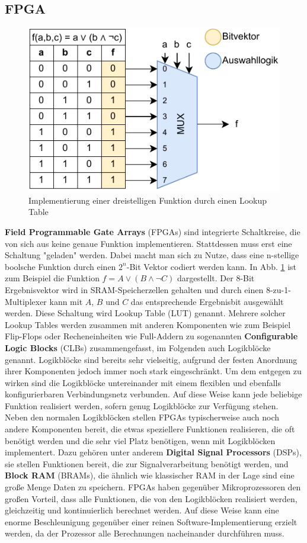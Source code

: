 \subsection{FPGA}
\label{sec:fpga}
\begin{figure}
    \center
    \includegraphics{images/LUT.pdf}
    \caption{Implementierung einer dreistelligen Funktion durch einen Lookup Table}
    \label{fig:fpga_lut}
\end{figure}
\textbf{Field Programmable Gate Arrays} (FPGAs) sind integrierte Schaltkreise, die von sich aus keine genaue Funktion implementieren. Stattdessen muss erst eine Schaltung "geladen" werden.
Dabei macht man sich zu Nutze, dass eine n-stellige boolsche Funktion durch einen $2^n$-Bit Vektor codiert werden kann. In Abb. \ref{fig:fpga_lut} ist zum Beispiel die Funktion $f = A \vee (B \wedge \neg C)$ dargestellt.
Der 8-Bit Ergebnisvektor wird in SRAM-Speicherzellen gehalten und durch einen 8-zu-1-Multiplexer kann mit $A$, $B$ und $C$ das entsprechende Ergebnisbit ausgewählt werden. Diese Schaltung wird Lookup Table (LUT) genannt.
Mehrere solcher Lookup Tables werden zusammen mit anderen Komponenten wie zum Beispiel Flip-Flops oder Recheneinheiten wie Full-Addern zu sogenannten \textbf{Configurable Logic Blocks} (CLBs) zusammengefasst, im Folgenden auch Logikblöcke genannt.
Logikblöcke sind bereits sehr vielseitig, aufgrund der festen Anordnung ihrer Komponenten jedoch immer noch stark eingeschränkt. Um dem entgegen zu wirken sind die Logikblöcke untereinander mit einem flexiblen
und ebenfalls konfigurierbaren Verbindungsnetz verbunden. Auf diese Weise kann jede beliebige Funktion realisiert werden, sofern genug Logikblöcke zur Verfügung stehen.
Neben den normalen Logikblöcken stellen FPGAs typischerweise auch noch andere Komponenten bereit, die etwas speziellere Funktionen realisieren, die oft benötigt werden
und die sehr viel Platz benötigen, wenn mit Logikblöcken implementert. Dazu gehören unter anderem \textbf{Digital Signal Processors} (DSPs), sie stellen Funktionen bereit, die zur Signalverarbeitung benötigt werden,
und \textbf{Block RAM} (BRAMs), die ähnlich wie klassischer RAM in der Lage sind eine große Menge Daten zu speichern.
FPGAs haben gegenüber Mikroprozessoren den großen Vorteil, dass alle Funktionen, die von den Logikblöcken realisiert werden, gleichzeitig und kontinuierlich berechnet werden.
Auf diese Weise kann eine enorme Beschleunigung gegenüber einer reinen Software-Implementierung erzielt werden, da der Prozessor alle Berechnungen nacheinander durchführen muss.

